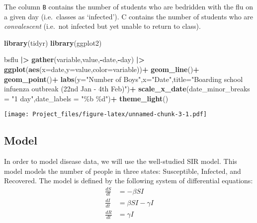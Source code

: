 \documentclass[
]{article}
\newenvironment{Shaded}{\begin{snugshade}}{\end{snugshade}}
\newcommand{\AttributeTok}[1]{\textcolor[rgb]{0.13,0.29,0.53}{#1}}
\newcommand{\FunctionTok}[1]{\textcolor[rgb]{0.13,0.29,0.53}{\textbf{#1}}}
\newcommand{\NormalTok}[1]{#1}
\newcommand{\SpecialCharTok}[1]{\textcolor[rgb]{0.81,0.36,0.00}{\textbf{#1}}}
\newcommand{\StringTok}[1]{\textcolor[rgb]{0.31,0.60,0.02}{#1}}
\begin{document}
The column \texttt{B} contains the number of students who are bedridden
with the flu on a given day (i.e.~classes as `infected'). C contains the
number of students who are \emph{convalescent} (i.e.~not infected but
yet unable to return to class).

\begin{Shaded}
\begin{Highlighting}[]
\FunctionTok{library}\NormalTok{(tidyr)}
\FunctionTok{library}\NormalTok{(ggplot2)}


\NormalTok{bsflu }\SpecialCharTok{|\textgreater{}}
    \FunctionTok{gather}\NormalTok{(variable,value,}\SpecialCharTok{{-}}\NormalTok{date,}\SpecialCharTok{{-}}\NormalTok{day) }\SpecialCharTok{|\textgreater{}}
    \FunctionTok{ggplot}\NormalTok{(}\FunctionTok{aes}\NormalTok{(}\AttributeTok{x=}\NormalTok{date,}\AttributeTok{y=}\NormalTok{value,}\AttributeTok{color=}\NormalTok{variable))}\SpecialCharTok{+}
    \FunctionTok{geom\_line}\NormalTok{()}\SpecialCharTok{+}
    \FunctionTok{geom\_point}\NormalTok{()}\SpecialCharTok{+}
    \FunctionTok{labs}\NormalTok{(}\AttributeTok{y=}\StringTok{"Number of Boys"}\NormalTok{,}\AttributeTok{x=}\StringTok{"Date"}\NormalTok{,}\AttributeTok{title=}\StringTok{"Boarding school infuenza outbreak (22nd Jan {-} 4th Feb)"}\NormalTok{)}\SpecialCharTok{+}
  \FunctionTok{scale\_x\_date}\NormalTok{(}\AttributeTok{date\_minor\_breaks =} \StringTok{"1 day"}\NormalTok{,}\AttributeTok{date\_labels =} \StringTok{"\%b \%d"}\NormalTok{)}\SpecialCharTok{+}
    \FunctionTok{theme\_light}\NormalTok{()}
\end{Highlighting}
\end{Shaded}

\texttt{[image: Project\_files/figure-latex/unnamed-chunk-3-1.pdf]}

\subsection{Model}\label{model}

In order to model disease data, we will use the well-studied SIR model.
This model models the number of people in three states: Susceptible,
Infected, and Recovered. The model is defined by the following system of
differential equations: \[
\begin{align*}
\frac{dS}{dt} &= -\beta S I \\
\frac{dI}{dt} &= \beta S I - \gamma I \\
\frac{dR}{dt} &= \gamma I
\end{align*}
\]
\end{document}
